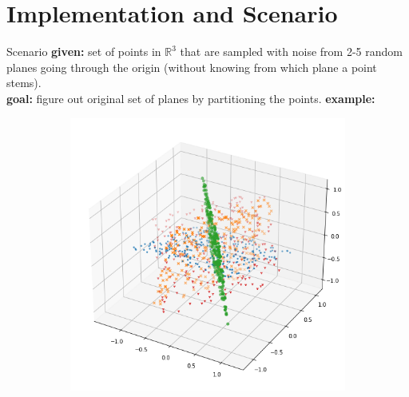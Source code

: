 \documentclass[10pt]{beamer}
\newcommand{\R}{\mathbb{R}}
\begin{document}
\section{Implementation and Scenario}
\begin{frame}{Scenario}
    \textbf{given:} set of points in $\R^3$ that are sampled with noise from 2-5 random planes going through the origin (without knowing from which plane a point stems).\\
    \textbf{goal:} figure out original set of planes by partitioning the points.
    \pause
    \textbf{example:}
    \begin{figure}
        \begin{subfigure}{.4\textwidth}
            \centering
            \includegraphics[width=\textwidth]{pics/ds3.png}
        \end{subfigure}%
        \hspace{1em}
        \begin{subfigure}{.4\textwidth}
            \centering

\end{subfigure}
\end{figure}
\end{frame}
\end{document}
